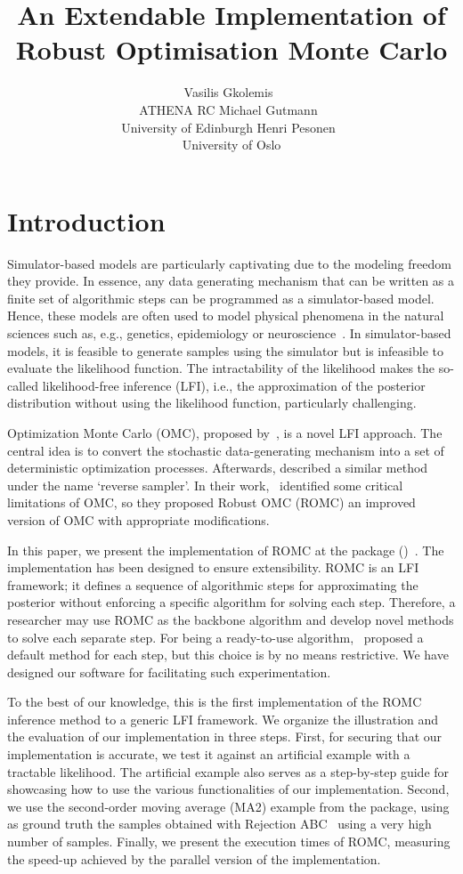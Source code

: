 \documentclass[article]{jss}
\author{Vasilis Gkolemis~\orcidlink{0000-0002-2636-0245}\\ATHENA RC \And
  Michael Gutmann~\orcidlink{0000-0002-5329-9910}\\University of Edinburgh \And
  Henri Pesonen~\orcidlink{0000-0003-4500-2926}\\University of Oslo}
\title{An Extendable \proglang{Python} Implementation of Robust Optimisation Monte Carlo}
\begin{document}
\section{Introduction}
\label{sec:intro}

Simulator-based models are particularly captivating due to the
modeling freedom they provide. In essence, any data generating
mechanism that can be written as a finite set of algorithmic steps can
be programmed as a simulator-based model. Hence, these models are
often used to model physical phenomena in the natural sciences such
as, e.g., genetics, epidemiology or neuroscience~\citet{gutmann2016,
  lintusaari2017, sisson2018, cranmer2020}. In simulator-based models,
it is feasible to generate samples using the simulator but is
infeasible to evaluate the likelihood function. The intractability of
the likelihood makes the so-called likelihood-free inference (LFI),
i.e., the approximation of the posterior distribution without using
the likelihood function, particularly challenging.

Optimization Monte Carlo (OMC), proposed by~\citet{Meeds2015}, is a
novel LFI approach. The central idea is to convert the stochastic
data-generating mechanism into a set of deterministic optimization
processes. Afterwards, \citet{Forneron2016} described a similar method
under the name `reverse sampler'. In their work,~\citet{Ikonomov2019}
identified some critical limitations of OMC, so they proposed Robust
OMC (ROMC) an improved version of OMC with appropriate modifications.

In this paper, we present the implementation of ROMC at the
 package  ()~\citet{1708.00707}. The implementation has been designed
to ensure extensibility. ROMC is an LFI framework; it defines a
sequence of algorithmic steps for approximating the posterior without
enforcing a specific algorithm for solving each step. Therefore, a
researcher may use ROMC as the backbone algorithm and develop novel
methods to solve each separate step. For being a ready-to-use
algorithm,~\citet{Ikonomov2019} proposed a default method for each
step, but this choice is by no means restrictive. We have designed our
software for facilitating such experimentation.

To the best of our knowledge, this is the first implementation of the
ROMC inference method to a generic LFI framework. We organize the
illustration and the evaluation of our implementation in three
steps. First, for securing that our implementation is accurate, we
test it against an artificial example with a tractable likelihood. The
artificial example also serves as a step-by-step guide for showcasing
how to use the various functionalities of our implementation. Second,
we use the second-order moving average (MA2) example from the
 package, using as ground truth the samples obtained with
Rejection ABC~\citet{lintusaari2017} using a very high number of
samples. Finally, we present the execution times of ROMC, measuring
the speed-up achieved by the parallel version of the
implementation.
\end{document}
